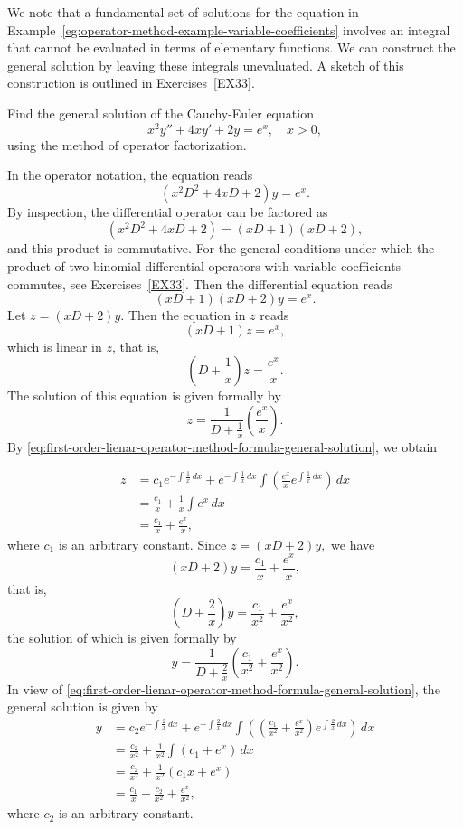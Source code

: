  We note that a fundamental set of solutions for the equation in Example~\ref{eg:operator-method-example-variable-coefficients} involves an integral that cannot be evaluated in terms of elementary functions. We can construct the general solution by leaving these integrals unevaluated.   A sketch of this construction is outlined in Exercises~\ref{EX33}.



\begin{example} \label{eg:Cauchy-Euler-Operator-method}
	Find the general solution of the Cauchy-Euler equation
	\[x^2y''+4xy'+2y=e^x, \quad x>0,\] using the  method of operator factorization.
\end{example}	
\begin{solution}
	In the operator notation, the equation reads
	\[(x^2D^2+4xD+2)y = e^x.\] By inspection,  the differential operator can be factored as
	\[(x^2D^2+4xD+2)= (xD+1)(xD+2),\] and this product is commutative. For the general conditions under which the product of two binomial differential operators with variable coefficients commutes, see Exercises~\ref{EX33}.
	Then the differential equation reads
	\[(xD+1)(xD+2)y =e^x.\] Let $z=(xD+2)y.$ Then the equation in $z$ reads
		\[(xD+1)z=e^x,\] which is linear in $z$,  that is, 
		\[\left(D+\frac{1}{x}\right)z=\frac{e^x}{x}.\] The solution of this equation is  given formally by
		\[z = \frac{1}{D+\frac{1}{x}}\left(\frac{e^x}{x}\right).\]
		By \eqref{eq:first-order-lienar-operator-method-formula-general-solution}, we obtain
		
	\[\begin{split}
		z&=c_1 e^{-\int \frac{1}{x}\,dx}+e^{-\int \frac{1}{x}\,dx}\int\left(\frac{e^x}{x}e^{\int \frac{1}{x}\,dx}\right)\,dx\\
		&=\frac{c_1}{x}+\frac{1}{x}\int e^x\,dx\\
		&=\frac{c_1}{x}+\frac{e^x}{x},
	\end{split} \] where $c_1$ is an arbitrary constant. Since $z=(xD+2)y,$ we have
	\[(xD+2)y = \frac{c_1}{x}+\frac{e^x}{x},\] that is,
	\[\left(D+\frac{2}{x}\right)y = \frac{c_1}{x^2}+\frac{e^x}{x^2},\]
	 the solution of which is given formally by
		\[y = \frac{1}{D+\frac{2}{x}}\left(\frac{c_1}{x^2}+\frac{e^x}{x^2}\right).\]  	In view of \eqref{eq:first-order-lienar-operator-method-formula-general-solution}, the general solution is given by
		\[
		\begin{split}
			y& = c_2e^{-\int\frac{2}{x}\,dx}+e^{-\int\frac{2}{x}\,dx}\int\left(\left(\frac{c_1}{x^2}+\frac{e^x}{x^2}\right)e^{\int\frac{2}{x}\,dx}\right)\,dx\\
			&=\frac{c_2}{x^2}+\frac{1}{x^2}\int (c_1+e^x)\, dx\\
			&=\frac{c_2}{x^2}+\frac{1}{x^2}(c_1x+e^x)\\
			&=\frac{c_1}{x}+\frac{c_2}{x^2}+\frac{e^x}{x^2},
		\end{split}
		\] where $c_2$ is an arbitrary constant.
\end{solution}

